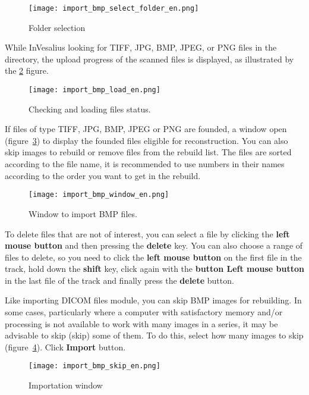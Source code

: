 \begin{figure}[!htb]
\centering
\texttt{[image: import\_bmp\_select\_folder\_en.png]}
\caption{Folder selection}
\label{fig:import_bmp_select_folder}
\end{figure}

While InVesalius looking for TIFF, JPG, BMP, JPEG, or PNG files in the directory, the upload progress of the scanned files is displayed, as illustrated by the \ref{fig:import_bmp_load_pt} figure.

\begin{figure}[!htb]
\centering
\texttt{[image: import\_bmp\_load\_en.png]}
\caption{Checking and loading files status.}
\label{fig:import_bmp_load_pt}
\end{figure}

If files of type TIFF, JPG, BMP, JPEG or PNG are founded, a window open (figure~\ref{fig:import_bmp_window_pt}) to display the founded files eligible for reconstruction. You can also skip images to rebuild or remove files from the rebuild list. The files are sorted according to the file name, it is recommended to use numbers in their names according to the order you want to get in the rebuild.

\begin{figure}[!htb]
\centering
\texttt{[image: import\_bmp\_window\_en.png]}
\caption{Window to import BMP files.}
\label{fig:import_bmp_window_pt}
\end{figure}
 
To delete files that are not of interest, you can select a file by clicking the \textbf{left mouse button} and then pressing the \textbf{delete} key. You can also choose a range of files to delete, so you need to click the \textbf{left mouse button} on the first file in the track, hold down the \textbf{shift} key, click again with the \textbf{button Left mouse button} in the last file of the track and finally press the \textbf{delete} button.
 
Like importing DICOM files module, you can skip BMP images for rebuilding. In some cases, particularly where a computer with satisfactory memory and/or processing is not available to work with many images in a series, it may be advisable to skip (skip) some of them. To do this, select how many images to skip (figure~\ref{fig:import_bmp_skip_pt}). Click \textbf{Import} button.

\begin{figure}[!htb]
\centering
\texttt{[image: import\_bmp\_skip\_en.png]}
\caption{Importation window}
\label{fig:import_bmp_skip_pt}
\end{figure}

